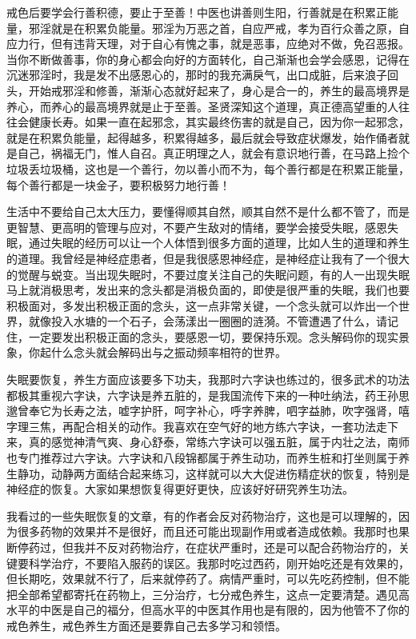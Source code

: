 戒色后要学会行善积德，要止于至善！中医也讲善则生阳，行善就是在积累正能量，邪淫就是在积累负能量。邪淫为万恶之首，自应严戒，孝为百行众善之原，自应力行，但有违背天理，对于自心有愧之事，就是恶事，应绝对不做，免召恶报。当你不断做善事，你的身心都会向好的方面转化，自己渐渐也会学会感恩，记得在沉迷邪淫时，我是发不出感恩心的，那时的我充满戾气，出口成脏，后来浪子回头，开始戒邪淫和修善，渐渐心态就好起来了，身心是合一的，养生的最高境界是养心，而养心的最高境界就是止于至善。圣贤深知这个道理，真正德高望重的人往往会健康长寿。如果一直在起邪念，其实最终伤害的就是自己，因为你一起邪念，就是在积累负能量，起得越多，积累得越多，最后就会导致症状爆发，始作俑者就是自己，祸福无门，惟人自召。真正明理之人，就会有意识地行善，在马路上捡个垃圾丢垃圾桶，这也是一个善行，勿以善小而不为，每个善行都是在积累正能量，每个善行都是一块金子，要积极努力地行善！

生活中不要给自己太大压力，要懂得顺其自然，顺其自然不是什么都不管了，而是更智慧、更高明的管理与应对，不要产生敌对的情绪，要学会接受失眠，感恩失眠，通过失眠的经历可以让一个人体悟到很多方面的道理，比如人生的道理和养生的道理。我曾经是神经症患者，但是我很感恩神经症，是神经症让我有了一个很大的觉醒与蜕变。当出现失眠时，不要过度关注自己的失眠问题，有的人一出现失眠马上就消极思考，发出来的念头都是消极负面的，即使是很严重的失眠，我们也要积极面对，多发出积极正面的念头，这一点非常关键，一个念头就可以炸出一个世界，就像投入水塘的一个石子，会荡漾出一圈圈的涟漪。不管遭遇了什么，请记住，一定要发出积极正面的念头，要感恩一切，要保持乐观。念头解码你的现实景象，你起什么念头就会解码出与之振动频率相符的世界。

失眠要恢复，养生方面应该要多下功夫，我那时六字诀也练过的，很多武术的功法都极其重视六字诀，六字诀是养五脏的，是我国流传下来的一种吐纳法，药王孙思邈曾奉它为长寿之法，嘘字护肝，呵字补心，呼字养脾，呬字益肺，吹字强肾，嘻字理三焦，再配合相关的动作。我喜欢在空气好的地方练六字诀，一套功法走下来，真的感觉神清气爽、身心舒泰，常练六字诀可以强五脏，属于内壮之法，南师也专门推荐过六字诀。六字诀和八段锦都属于养生动功，而养生桩和打坐则属于养生静功，动静两方面结合起来练习，这样就可以大大促进伤精症状的恢复，特别是神经症的恢复。大家如果想恢复得更好更快，应该好好研究养生功法。

我看过的一些失眠恢复的文章，有的作者会反对药物治疗，这也是可以理解的，因为很多药物的效果并不是很好，而且还可能出现副作用或者造成依赖。我那时也果断停药过，但我并不反对药物治疗，在症状严重时，还是可以配合药物治疗的，关键要科学治疗，不要陷入服药的误区。我那时吃过西药，刚开始吃还是有效果的，但长期吃，效果就不行了，后来就停药了。病情严重时，可以先吃药控制，但不能把全部希望都寄托在药物上，三分治疗，七分戒色养生，这点一定要清楚。遇见高水平的中医是自己的福分，但高水平的中医其作用也是有限的，因为他管不了你的戒色养生，戒色养生方面还是要靠自己去多学习和领悟。

